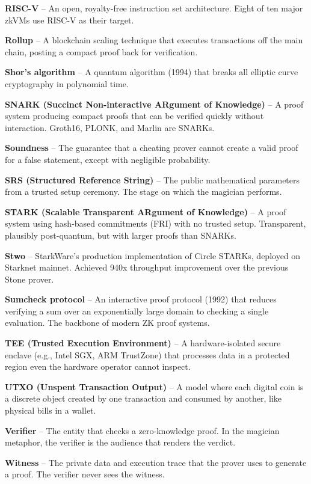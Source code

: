 \documentclass[
  11pt,
  openany]{report}
\renewcommand{\textbf}[1]{{\bfseries\color{MidnightBold}#1}}
\begin{document}
\textbf{RISC-V} -- An open, royalty-free instruction set architecture. Eight of
ten major zkVMs use RISC-V as their target.

\textbf{Rollup} -- A blockchain scaling technique that executes transactions off
the main chain, posting a compact proof back for verification.

\textbf{Shor's algorithm} -- A quantum algorithm (1994) that breaks all elliptic
curve cryptography in polynomial time.

\textbf{SNARK (Succinct Non-interactive ARgument of Knowledge)} -- A proof
system producing compact proofs that can be verified quickly without
interaction. Groth16, PLONK, and Marlin are SNARKs.

\textbf{Soundness} -- The guarantee that a cheating prover cannot create a valid
proof for a false statement, except with negligible probability.

\textbf{SRS (Structured Reference String)} -- The public mathematical parameters
from a trusted setup ceremony. The stage on which the magician performs.

\textbf{STARK (Scalable Transparent ARgument of Knowledge)} -- A proof system
using hash-based commitments (FRI) with no trusted setup. Transparent, plausibly
post-quantum, but with larger proofs than SNARKs.

\textbf{Stwo} -- StarkWare's production implementation of Circle STARKs,
deployed on Starknet mainnet. Achieved 940x throughput improvement over the
previous Stone prover.

\textbf{Sumcheck protocol} -- An interactive proof protocol (1992) that reduces
verifying a sum over an exponentially large domain to checking a single
evaluation. The backbone of modern ZK proof systems.

\textbf{TEE (Trusted Execution Environment)} -- A hardware-isolated secure
enclave (e.g., Intel SGX, ARM TrustZone) that processes data in a protected
region even the hardware operator cannot inspect.

\textbf{UTXO (Unspent Transaction Output)} -- A model where each digital coin is
a discrete object created by one transaction and consumed by another, like
physical bills in a wallet.

\textbf{Verifier} -- The entity that checks a zero-knowledge proof. In the
magician metaphor, the verifier is the audience that renders the verdict.

\textbf{Witness} -- The private data and execution trace that the prover uses to
generate a proof. The verifier never sees the witness.
\end{document}
